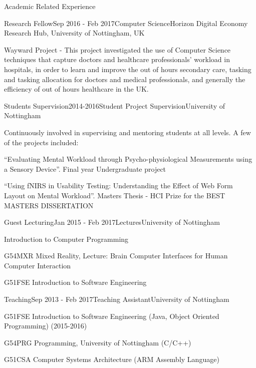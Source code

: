 \documentclass{resume} %
\begin{document}
\begin{rSection}{Academic Related Experience}
	\begin{rSubsection}{Research Fellow}{Sep 2016 - Feb 2017}{Computer Science}{Horizon Digital Economy Research Hub, University of Nottingham, UK}
		\item Wayward Project -  This project investigated the use of Computer Science techniques that capture doctors and healthcare professionals' workload in hospitals, in order to learn and improve the out of hours secondary care, tasking and tasking allocation for doctors and medical professionals, and generally the efficiency of out of hours healthcare in the UK.
	\end{rSubsection}	
	
	\begin{rSubsection}{Students Supervision}{2014-2016}{Student Project Supervision}{University of Nottingham}
		\item Continuously involved in supervising and mentoring students at all levels. A few of the projects included:
        \item  ``Evaluating Mental Workload through Psycho-physiological Measurements using a Sensory Device''. Final year Undergraduate project
        \item  ``Using fNIRS in Usability Testing: Understanding the Effect of Web Form Layout on Mental Workload''. Masters Thesis - HCI Prize for the BEST MASTERS DISSERTATION
    \end{rSubsection}
    \vspace{-1 mm}
\vspace{-1 mm}
    \begin{rSubsection}{Guest Lecturing}{Jan 2015 - Feb 2017}{Lectures}{University of Nottingham}
    	\item Introduction to Computer Programming 
        \item G54MXR Mixed Reality, Lecture: Brain Computer Interfaces for Human Computer Interaction
        \item G51FSE Introduction to Software Engineering
    \end{rSubsection}
\vspace{-1 mm}
    \begin{rSubsection}{Teaching}{Sep 2013 - Feb 2017}{Teaching Assistant}{University of Nottingham}
        \item G51FSE Introduction to Software Engineering (Java, Object Oriented Programming) (2015-2016)
        \item G54PRG Programming, University of Nottingham (C/C++)
        \item G51CSA Computer Systems Architecture (ARM Assembly Language)

\end{rSubsection}
\end{rSection}
\end{document}
